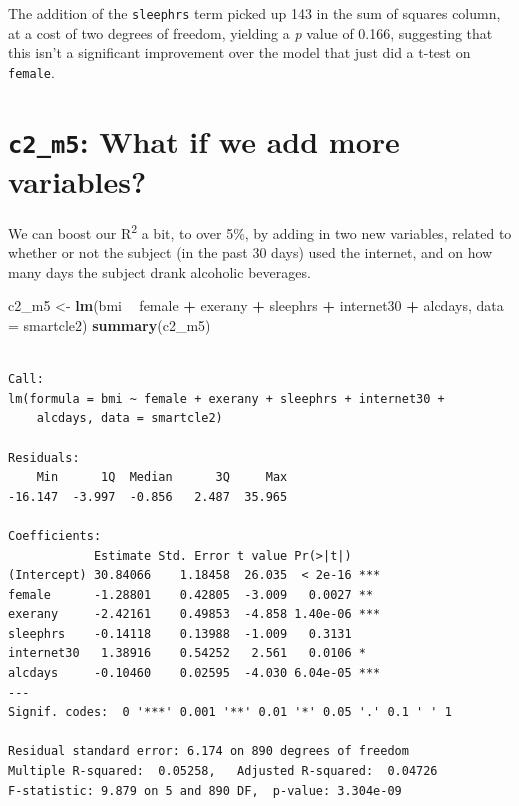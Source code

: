\documentclass[]{book}
\newenvironment{Shaded}{\begin{snugshade}}{\end{snugshade}}
\newcommand{\KeywordTok}[1]{\textcolor[rgb]{0.13,0.29,0.53}{\textbf{#1}}}
\newcommand{\DataTypeTok}[1]{\textcolor[rgb]{0.13,0.29,0.53}{#1}}
\newcommand{\StringTok}[1]{\textcolor[rgb]{0.31,0.60,0.02}{#1}}
\newcommand{\OperatorTok}[1]{\textcolor[rgb]{0.81,0.36,0.00}{\textbf{#1}}}
\newcommand{\NormalTok}[1]{#1}
\theoremstyle{definition}
\theoremstyle{definition}
\theoremstyle{definition}
\theoremstyle{remark}
\begin{document}
The addition of the \texttt{sleephrs} term picked up 143 in the sum of
squares column, at a cost of two degrees of freedom, yielding a \emph{p}
value of 0.166, suggesting that this isn't a significant improvement
over the model that just did a t-test on \texttt{female}.

\section{\texorpdfstring{\texttt{c2\_m5}: What if we add more
variables?}{c2\_m5: What if we add more variables?}}\label{c2_m5-what-if-we-add-more-variables}

We can boost our R\textsuperscript{2} a bit, to over 5\%, by adding in
two new variables, related to whether or not the subject (in the past 30
days) used the internet, and on how many days the subject drank
alcoholic beverages.

\begin{Shaded}
\begin{Highlighting}[]
\NormalTok{c2_m5 <-}\StringTok{ }\KeywordTok{lm}\NormalTok{(bmi }\OperatorTok{~}\StringTok{ }\NormalTok{female }\OperatorTok{+}\StringTok{ }\NormalTok{exerany }\OperatorTok{+}\StringTok{ }\NormalTok{sleephrs }\OperatorTok{+}\StringTok{ }\NormalTok{internet30 }\OperatorTok{+}\StringTok{ }\NormalTok{alcdays,}
         \DataTypeTok{data =}\NormalTok{ smartcle2)}
\KeywordTok{summary}\NormalTok{(c2_m5)}
\end{Highlighting}
\end{Shaded}

\begin{verbatim}

Call:
lm(formula = bmi ~ female + exerany + sleephrs + internet30 + 
    alcdays, data = smartcle2)

Residuals:
    Min      1Q  Median      3Q     Max 
-16.147  -3.997  -0.856   2.487  35.965 

Coefficients:
            Estimate Std. Error t value Pr(>|t|)    
(Intercept) 30.84066    1.18458  26.035  < 2e-16 ***
female      -1.28801    0.42805  -3.009   0.0027 ** 
exerany     -2.42161    0.49853  -4.858 1.40e-06 ***
sleephrs    -0.14118    0.13988  -1.009   0.3131    
internet30   1.38916    0.54252   2.561   0.0106 *  
alcdays     -0.10460    0.02595  -4.030 6.04e-05 ***
---
Signif. codes:  0 '***' 0.001 '**' 0.01 '*' 0.05 '.' 0.1 ' ' 1

Residual standard error: 6.174 on 890 degrees of freedom
Multiple R-squared:  0.05258,   Adjusted R-squared:  0.04726 
F-statistic: 9.879 on 5 and 890 DF,  p-value: 3.304e-09
\end{verbatim}
\end{document}
